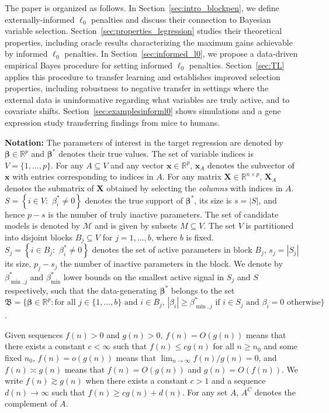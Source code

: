 \documentclass[
  12pt]{article}
\newcommand{\R}{\mathbb{R}}
\newcommand{\M}{\mathcal{M}}
\newcommand{\bx}{\mathbf{x}}
\newcommand{\bbeta}{\boldsymbol{\beta}}
\newcommand{\bX}{\mathbf{X}}
\begin{document}
The paper is organized as follows.
In Section~\ref{sec:intro_blockpen}, we define externally-informed $\ell_0$ penalties and discuss their connection to Bayesian variable selection.
Section~\ref{sec:properties_legression} studies their theoretical properties, including oracle results characterizing the maximum gains achievable by informed $\ell_0$ penalties. In Section~\ref{sec:informed_l0}, we propose a data-driven empirical Bayes procedure for setting informed $\ell_0$ penalties.
Section~\ref{sec:TL} applies this procedure to transfer learning and establishes improved selection properties, including robustness to negative transfer in settings where the external data is uninformative regarding what variables are truly active, and to covariate shifts.
Section~\ref{sec:examplesinforml0} shows simulations and a gene expression study transferring findings from mice to humans.

\textbf{Notation:}
The parameters of interest in the target regression are denoted by $\bbeta\in \R^p$  
and $\bbeta^*$ denotes their true values. The set of variable indices is $V=\{1,\ldots,p\}$. For any $A\subseteq V$ and any vector $\bx\in \R^p$, $\bx_A$ denotes the subvector of $\bx$ with entries corresponding to indices in $A$. For any matrix $\bX \in \R^{n\times p}$, $\bX_A$ denotes the submatrix of $\bX$ obtained by selecting the \emph{columns} with indices in $A$. $S=\left\{i\in V:\,\,  \beta^*_i \neq 0 \right\}$ denotes the true support of $\bbeta^*$, its size is $s=|S|$, and hence $p-s$ is the number of truly inactive parameters. The set of candidate models is denoted by $\M$ and is given by subsets $M\subseteq V$. The set $V$ is partitioned into disjoint blocks $B_j \subseteq V$ for $j=1,\ldots,b$, where $b$ is fixed. $S_j=\left\{i\in B_j:\,\,  \beta^*_i \neq 0\right\}$ denotes the set of active parameters in block $B_j$, $s_j=|S_j|$ its size, $p_j-s_j$ the number of inactive parameters in the block. We denote by $\beta_{\min,j}^*$ and $\beta_{\min}^*$ lower bounds on the smallest active signal in $S_j$ and $S$ respectively, such that
the data-generating $\bbeta^*$ belongs to the set $\mathfrak{B}=\{\bbeta \in \R^p: \text{for all }j \in \{1,\ldots,b\} \text{ and }i \in B_j,\, |\beta_i|\geq  \beta^*_{\min,j} \text{ if } i\in S_j \text{ and }  \beta_i= 0 \text{ otherwise}\}$.

Given sequences $f(n) > 0$ and $g(n) >0$, $f(n)=O(g(n))$ means that there exists a constant $c<\infty$ such that $f(n) \leq c g(n)$ for all $n \geq n_0$ and some fixed $n_0$, $f(n)=o(g(n))$ means that $\lim_{n\to\infty}f(n)/g(n)=0$, and $f(n)\asymp g(n)$ means that $f(n) = O(g(n))$ and $g(n) = O(f(n))$. We write $f(n) \gtrsim g(n)$ when there exists a constant $c>1$ and a sequence $d(n)\to\infty$ such that $f(n) \geq c g(n)+d(n)$. For any set $A$, $A^C$ denotes the complement of $A$.
\end{document}
